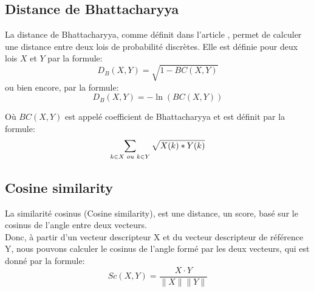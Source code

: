 \subsection{Distance de Bhattacharyya}
La distance de Bhattacharyya, comme définit dans l'article \cite{bhattacharyya_measure_1960}, permet de calculer une distance entre deux lois de probabilité discrètes. Elle est définie pour deux lois $X$ et $Y$ par la formule:
$$D_{B}(X, Y) = \sqrt{1 - BC(X, Y)}$$
ou bien encore, par la formule:
$$D_{B}(X, Y) = -\ln(BC(X, Y))$$

Où $BC(X, Y)$ est appelé coefficient de Bhattacharyya et est définit par la formule:
$$\sum_{k \in X \hspace{0.1cm} ou \hspace{0.1cm} k \in Y} \sqrt{X(k)*Y(k)}$$


\subsection{Cosine similarity}
La similarité cosinus (Cosine similarity), est une distance, un score, basé sur le cosinus de l'angle entre deux vecteurs.\\
Donc, à partir d'un vecteur descripteur X et du vecteur descripteur de référence Y, nous pouvons calculer le cosinus de l'angle formé par les deux vecteurs, qui est donné par la formule:
$$Sc(X, Y) = \frac{X \cdot Y}{\|X\|\|Y\|}$$\\


\clearpage
